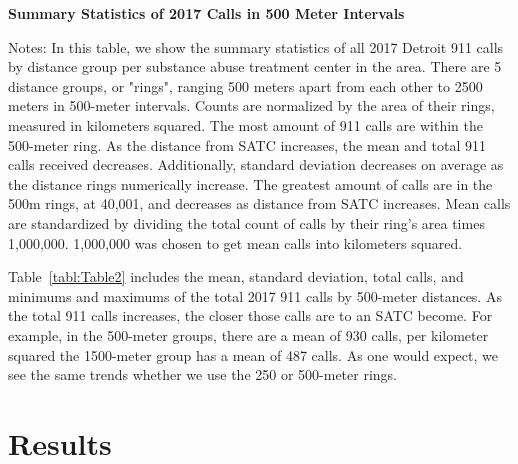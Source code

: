 \documentclass[12pt]{article}
\begin{document}
\begin{table}[hb!]
\centering
\scalebox{0.8}{
\centering

}
\caption{\textbf{Summary Statistics of 2017 Calls in 500 Meter Intervals}}
\label{tabl:Table2}
\centering\footnotesize{Notes: In this table, we show the summary statistics of all 2017 Detroit 911 calls by distance group per substance abuse treatment center in the area. There are 5 distance groups, or "rings", ranging 500 meters apart from each other to 2500 meters in 500-meter intervals. Counts are normalized by the area of their rings, measured in kilometers squared. The most amount of 911 calls are within the 500-meter ring. As the distance from SATC increases, the mean and total 911 calls received decreases. Additionally, standard deviation decreases on average as the distance rings numerically increase. The greatest amount of calls are in the 500m rings, at 40,001, and decreases as distance from SATC increases. Mean calls are standardized by dividing the total count of calls by their ring's area times 1,000,000. 1,000,000 was chosen to get mean calls into kilometers squared. }
\end{table}

Table~\ref{tabl:Table2} includes the mean, standard deviation, total calls, and minimums and maximums of the total 2017 911 calls by 500-meter distances. As the total 911 calls increases, the closer those calls are to an SATC become. For example, in the 500-meter groups, there are a mean of 930 calls, per kilometer squared the 1500-meter group has a mean of 487 calls. As one would expect, we see the same trends whether we use the 250 or 500-meter rings.



\section{Results}
\label{sec:result}
\end{document}
